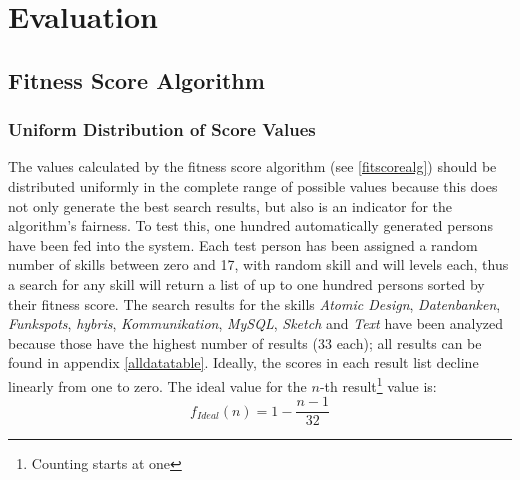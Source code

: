\chapter{Evaluation}

\section{Fitness Score Algorithm}

\subsection{Uniform Distribution of Score Values}
The values calculated by the fitness score algorithm (see \ref{fitscorealg}) should be distributed uniformly in the complete range of possible values because this does not only generate the best search results, but also is an indicator for the algorithm's fairness.
To test this, one hundred automatically generated persons have been fed into the system. Each test person has been assigned a random number of skills between zero and 17, with random skill and will levels each, thus a search for any skill will return a list of up to one hundred persons sorted by their fitness score. The search results for the skills \textit{Atomic Design}, \textit{Datenbanken}, \textit{Funkspots}, \textit{hybris}, \textit{Kommunikation}, \textit{MySQL}, \textit{Sketch} and \textit{Text} have been analyzed because those have the highest number of results (33 each); all results can be found in appendix \ref{alldatatable}. Ideally, the scores in each result list decline linearly from one to zero. The ideal value for the $n$-th result\footnote{Counting starts at one} value is:
\[
	f_{Ideal}(n) = 1 - \frac{n-1}{32}
\]

